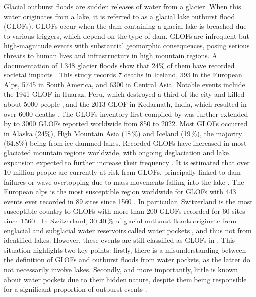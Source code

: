Glacial outburst floods are sudden releases of water from a glacier. When this water originates from a lake, it is referred to as a glacial lake outburst flood (GLOFs). GLOFs occur when the dam containing a glacial lake is breached due to various triggers, which depend on the type of dam. GLOFs are infrequent but high-magnitude events with substantial geomorphic consequences, posing serious threats to human lives and infrastructure in high mountain regions. A documentation of 1,348 glacier floods show that 24\% of them have recorded societal impacts \citep{Carrivick&Tweed2016}. This study records 7 deaths in Iceland, 393 in the European Alps, 5745 in South America, and 6300 in Central Asia. Notable events include the 1941 GLOF in Huaraz, Peru, which destroyed a third of the city and killed about 5000 people \citep{Carey2005}, and the 2013 GLOF in Kedarnath, India, which resulted in over 6000 deaths \citep{Allen&al2016}. The GLOFs inventory first compiled by \cite{Carrivick&Tweed2016} was further extended by \cite{Emmer&al2022, Veh&al2022, Lutzow&al2023} to 3000 GLOFs reported worldwide from 850 to 2022. Most GLOFs occurred in Alaska (24\%), High Mountain Asia (18\,\%) and Iceland (19\,\%), the majority (64.8\%) being from ice-dammed lakes. Recorded GLOFs have increased in most glaciated mountain regions worldwide, with ongoing deglaciation and lake expansion expected to further increase their frequency \cite{Zhang&al2024}. It is estimated that over 10 million people are currently at risk from GLOFs, principally linked to dam failures or wave overtopping due to mass movements falling into the lake \citep{Zhang&al2024}. The European alps is the most susceptible region worldwide for GLOFs with 443 events ever recorded in 89 sites since 1560 \citep{Carrivick&Tweed2016,Lutzow&al2023}. In particular, Switzerland is the most susceptible country to GLOFs with more than 200 GLOFs recorded for 60 sites since 1560 \cite{Carrivick&Tweed2016}. %
In Switzerland, 30-40\,\% of glacial outburst floods originate from englacial and subglacial water reservoirs called water pockets \citep{Haeberli1983}, and thus not from identified lakes. However, these events are still classified as GLOFs in \cite{Lutzow&al2023, Zhang&al2024}. This situation highlights two key points: firstly, there is a misunderstanding between the definition of GLOFs and outburst floods from water pockets, as the latter do not necessarily involve lakes. Secondly, and more importantly, little is known about water pockets due to their hidden nature, despite them being responsible for a significant proportion of outburst events \citep[e.g. 49\,\% of all type of GLOFs in the European Alps][]{Lutzow&al2023}.

